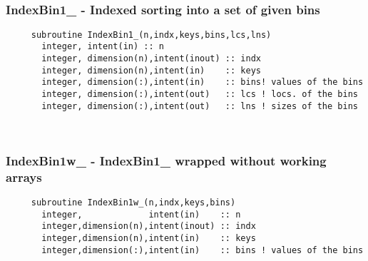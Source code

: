  
\mbox{}\hrulefill\ 
 
  \subsubsection{IndexBin1\_ - Indexed sorting into a set of given bins}

\begin{verbatim} 
     subroutine IndexBin1_(n,indx,keys,bins,lcs,lns)
       integer, intent(in) :: n
       integer, dimension(n),intent(inout) :: indx
       integer, dimension(n),intent(in)    :: keys
       integer, dimension(:),intent(in)    :: bins! values of the bins
       integer, dimension(:),intent(out)   :: lcs ! locs. of the bins
       integer, dimension(:),intent(out)   :: lns ! sizes of the bins
 \end{verbatim} %
 
 
\mbox{}\hrulefill\ 
 
  \subsubsection{IndexBin1w\_ - IndexBin1\_ wrapped without working arrays}

\begin{verbatim} 
     subroutine IndexBin1w_(n,indx,keys,bins)
       integer,             intent(in)    :: n
       integer,dimension(n),intent(inout) :: indx
       integer,dimension(n),intent(in)    :: keys
       integer,dimension(:),intent(in)    :: bins ! values of the bins
 \end{verbatim} %


 
 
\mbox{}\hrulefill\ 
 
